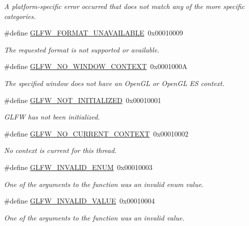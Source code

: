 \begin{DoxyCompactItemize}
\begin{DoxyCompactList}\small\item\em A platform-\/specific error occurred that does not match any of the more specific categories. \end{DoxyCompactList}\item 
\#define \hyperlink{group__errors_ga196e125ef261d94184e2b55c05762f14}{G\+L\+F\+W\+\_\+\+F\+O\+R\+M\+A\+T\+\_\+\+U\+N\+A\+V\+A\+I\+L\+A\+B\+LE}~0x00010009
\begin{DoxyCompactList}\small\item\em The requested format is not supported or available. \end{DoxyCompactList}\item 
\#define \hyperlink{group__errors_gacff24d2757da752ae4c80bf452356487}{G\+L\+F\+W\+\_\+\+N\+O\+\_\+\+W\+I\+N\+D\+O\+W\+\_\+\+C\+O\+N\+T\+E\+XT}~0x0001000A
\begin{DoxyCompactList}\small\item\em The specified window does not have an Open\+GL or Open\+GL ES context. \end{DoxyCompactList}\item 
\#define \hyperlink{group__errors_ga2374ee02c177f12e1fa76ff3ed15e14a}{G\+L\+F\+W\+\_\+\+N\+O\+T\+\_\+\+I\+N\+I\+T\+I\+A\+L\+I\+Z\+ED}~0x00010001
\begin{DoxyCompactList}\small\item\em G\+L\+FW has not been initialized. \end{DoxyCompactList}\item 
\#define \hyperlink{group__errors_gaa8290386e9528ccb9e42a3a4e16fc0d0}{G\+L\+F\+W\+\_\+\+N\+O\+\_\+\+C\+U\+R\+R\+E\+N\+T\+\_\+\+C\+O\+N\+T\+E\+XT}~0x00010002
\begin{DoxyCompactList}\small\item\em No context is current for this thread. \end{DoxyCompactList}\item 
\#define \hyperlink{group__errors_ga76f6bb9c4eea73db675f096b404593ce}{G\+L\+F\+W\+\_\+\+I\+N\+V\+A\+L\+I\+D\+\_\+\+E\+N\+UM}~0x00010003
\begin{DoxyCompactList}\small\item\em One of the arguments to the function was an invalid enum value. \end{DoxyCompactList}\item 
\#define \hyperlink{group__errors_gaaf2ef9aa8202c2b82ac2d921e554c687}{G\+L\+F\+W\+\_\+\+I\+N\+V\+A\+L\+I\+D\+\_\+\+V\+A\+L\+UE}~0x00010004
\begin{DoxyCompactList}\small\item\em One of the arguments to the function was an invalid value. \end{DoxyCompactList}\item 

\end{DoxyCompactItemize}
